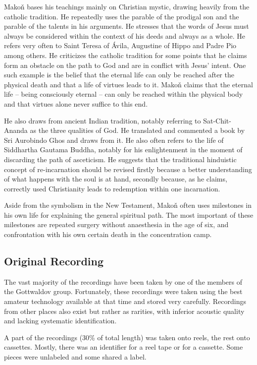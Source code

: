 \documentclass[runningheads]{llncs}
\begin{document}
Makoň bases his teachings mainly on Christian mystic, drawing
heavily from the catholic tradition. He repeatedly uses the parable of the
prodigal son and the parable of the talents in his arguments. He stresses that
the words of Jesus must always be considered within the context of his deeds and
always as a whole. He refers very often to Saint Teresa of
Ávila, Augustine of Hippo and Padre Pio among others. He criticizes the catholic
tradition for some points that he claims form an obstacle on the path to God and
are in conflict with Jesus' intent. One such example is the belief that the
eternal life can only be reached after the physical death and that a life of
virtues leads to it. Makoň claims that the eternal life -- being consciously
eternal -- can only be reached within the physical body and that virtues alone
never suffice to this end.

He also draws from ancient Indian tradition, notably referring to
Sat-Chit-Ananda as the three qualities of God. He translated and commented a
book by Sri Aurobindo Ghos and draws from it. He also often refers to the life
of Siddhartha Gautama Buddha, notably for his enlightenment in the moment of
discarding the path of asceticism. He suggests that the traditional hinduistic
concept of re-incarnation should be revised firstly because a better
understanding of what happens with the soul is at hand, secondly because, as he
claims, correctly used Christianity leads to redemption within one incarnation.

Aside from the symbolism in the New Testament, Makoň often uses milestones in
his own life for explaining the general spiritual path. The most important of
these milestones are repeated surgery without anaesthesia in the age of six, and
confrontation with his own certain death in the concentration camp.

\subsection{Original Recording}

The vast majority of the recordings have been taken by one of the members
of the Gottwaldov group. Fortunately, these recordings were taken using the best
amateur technology available at that time and stored very carefully. Recordings
from other places also exist but rather as rarities, with inferior acoustic
quality and lacking systematic identification.

A part of the recordings (30\% of total length) was taken onto reels, the rest onto cassettes. Mostly, there was an identifier for a reel tape or for a cassette. Some pieces were unlabeled and some shared a label. 
\end{document}
